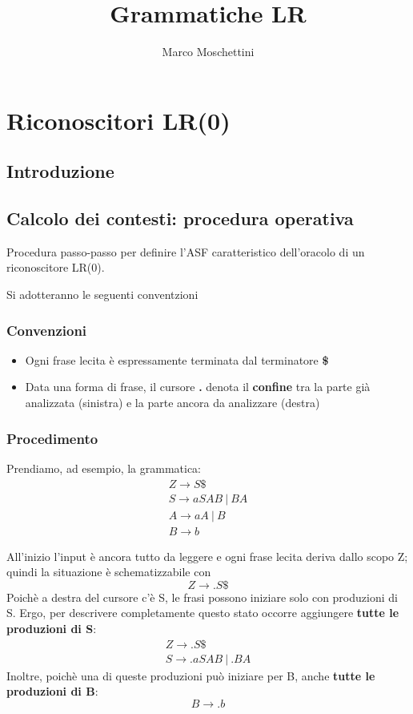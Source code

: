 \documentclass[a4paper, fleqn]{report}
\title{Grammatiche LR}
\author{Marco Moschettini}
\begin{document}
\maketitle

\chapter{Riconoscitori LR(0)}

\section{Introduzione}

\section{Calcolo dei contesti: procedura operativa}
Procedura passo-passo per definire l'ASF caratteristico dell'oracolo di un riconoscitore LR(0).

Si adotteranno le seguenti conventzioni
\subsection{Convenzioni}
\begin{itemize}
\item Ogni frase lecita è espressamente terminata dal terminatore \textbf{\$}
\item Data una forma di frase, il cursore \textbf{.} denota il \textbf{confine} tra la parte già analizzata (sinistra) e la parte ancora da analizzare (destra)
\end{itemize}

\subsection{Procedimento}
Prendiamo, ad esempio, la grammatica:
\begin{gather*}
Z \rightarrow S \$ \\
S \rightarrow aSAB\ |\ BA \\
A \rightarrow aA\ |\ B \\
B \rightarrow b
\end{gather*}

All'inizio l'input è ancora tutto da leggere e ogni frase lecita deriva dallo scopo Z; quindi la situazione è schematizzabile con
\[Z \rightarrow .S\$\]
Poichè a destra del cursore c'è S, le frasi possono iniziare solo con produzioni di S. Ergo, per descrivere completamente questo stato occorre aggiungere \textbf{tutte le produzioni di S}:
\begin{gather*}
Z \rightarrow .S \$ \\
S \rightarrow .aSAB\ |\ .BA
\end{gather*}
Inoltre, poichè una di queste produzioni può iniziare per B, anche \textbf{tutte le produzioni di B}:
\[B \rightarrow .b\]
\end{document}
